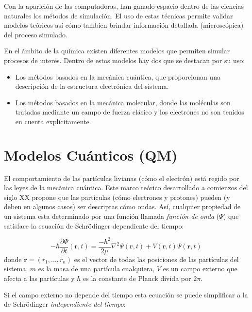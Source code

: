 Con la aparici\'on de las computadoras, han ganado espacio dentro de las ciencias naturales los m\'etodos de simulaci\'on.
El uso de estas t\'ecnicas permite validar modelos te\'oricos as\'i c\'omo tambien brindar informaci\'on detallada (microsc\'opica) del proceso simulado.

En el \'ambito de la qu\'imica existen diferentes modelos que permiten simular procesos de inter\'es.
Dentro de estos modelos hay dos que se destacan por su uso:
\begin{itemize}
\item Los m\'etodos basados en la mec\'anica cu\'antica, que proporcionan una descripci\'on de la estructura electr\'onica del sistema.

\item Los m\'etodos basados en la mec\'anica molecular, donde las mol\'eculas son tratadas mediante un campo de fuerza cl\'asico y los electrones no son tenidos en cuenta expl\'icitamente.
\end{itemize}

\section{Modelos Cu\'anticos (QM)}

El comportamiento de las part\'iculas livianas (c\'omo el electr\'on) est\'a regido por las leyes de la mec\'anica cu\'antica.
Este marco te\'orico desarrollado a comienzos del siglo XX propone que las part\'iculas (c\'omo electrones y protones) pueden (y deben en algunos casos)
ser descriptas c\'omo ondas. As\'i, cualquier propiedad de un sistema esta determinado por una funci\'on llamada \emph{funci\'on de onda} ($\Psi$) que satisface la ecuaci\'on de Schr\"{o}dinger dependiente del tiempo:

\begin{equation}
    \label{schro_time_dep}
    -\hbar\frac{\partial \Psi}{\partial t} (\mathbf{r},t) = \frac{-\hbar^2}{2\mu}\nabla^2 \Psi(\mathbf{r},t) + V(\mathbf{r},t) \Psi(\mathbf{r},t)
\end{equation}
donde $\mathbf{r} = (r_1,\dots,r_n)$ es el vector de todas las posiciones de las part\'iculas del sistema,
$m$ es la masa de una part\'icula cualquiera, $V$ es un campo externo que afecta a las part\'iculas y
$\hbar$ es la constante de Planck divida por $2\pi$.

Si el campo externo no depende del tiempo esta ecuaci\'on se puede simplificar a
la de Schr\"{o}dinger \textit{independiente del tiempo}:

